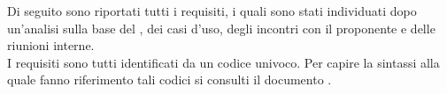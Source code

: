 
Di seguito sono riportati tutti i requisiti, i quali sono stati individuati dopo un'analisi sulla base del , dei casi d'uso, degli incontri con il proponente e delle riunioni interne.\\
I requisiti sono tutti identificati da un codice univoco. Per capire la sintassi alla quale fanno riferimento tali codici si consulti il documento .

%



%




